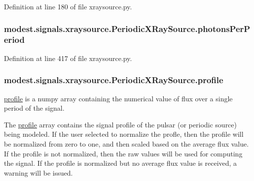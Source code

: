 Definition at line 180 of file xraysource.\+py.

\subsubsection[{\texorpdfstring{photons\+Per\+Period}{photonsPerPeriod}}]{\setlength{\rightskip}{0pt plus 5cm}modest.\+signals.\+xraysource.\+Periodic\+X\+Ray\+Source.\+photons\+Per\+Period}\hypertarget{classmodest_1_1signals_1_1xraysource_1_1PeriodicXRaySource_a25ab09a55afd1da4f019ad580770e5f4}{}\label{classmodest_1_1signals_1_1xraysource_1_1PeriodicXRaySource_a25ab09a55afd1da4f019ad580770e5f4}


Definition at line 417 of file xraysource.\+py.

\subsubsection[{\texorpdfstring{profile}{profile}}]{\setlength{\rightskip}{0pt plus 5cm}modest.\+signals.\+xraysource.\+Periodic\+X\+Ray\+Source.\+profile}\hypertarget{classmodest_1_1signals_1_1xraysource_1_1PeriodicXRaySource_a50e061bb97d0dd6ab7f344370c6b35a4}{}\label{classmodest_1_1signals_1_1xraysource_1_1PeriodicXRaySource_a50e061bb97d0dd6ab7f344370c6b35a4}


\hyperlink{classmodest_1_1signals_1_1xraysource_1_1PeriodicXRaySource_a50e061bb97d0dd6ab7f344370c6b35a4}{profile} is a numpy array containing the numerical value of flux over a single period of the signal. 

The \hyperlink{classmodest_1_1signals_1_1xraysource_1_1PeriodicXRaySource_a50e061bb97d0dd6ab7f344370c6b35a4}{profile} array contains the signal profile of the pulsar (or periodic source) being modeled. If the user selected to normalize the profle, then the profile will be normalized from zero to one, and then scaled based on the average flux value. If the profile is not normalized, then the raw values will be used for computing the signal. If the profile is normalized but no average flux value is received, a warning will be issued. 

